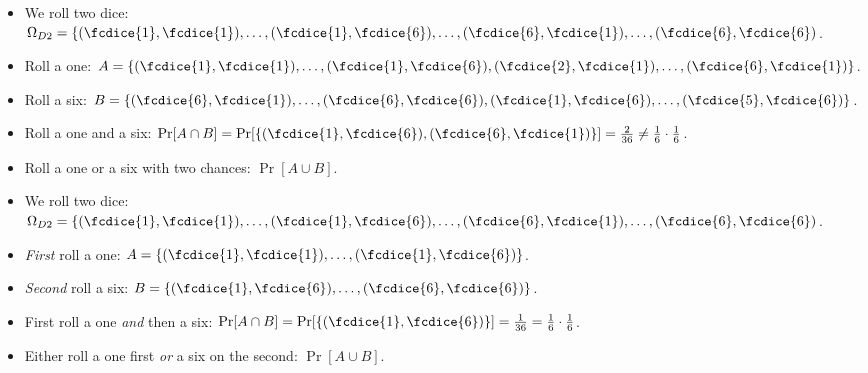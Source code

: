 \begin{frame}
  \begin{example}
    \begin{itemize}
      \item We roll two dice: \(\Omega_{D2} = \{(\fcdice{1},\fcdice{1}), 
          \ldots, (\fcdice{1}, \fcdice{6}), \ldots, (\fcdice{6}, \fcdice{1}), 
          \ldots, (\fcdice{6}, \fcdice{6})\).

        \pause{}

      \item Roll a one: \(A = \{(\fcdice{1}, \fcdice{1}), \ldots, (\fcdice{1}, 
          \fcdice{6}), (\fcdice{2}, \fcdice{1}), \ldots, (\fcdice{6}, 
          \fcdice{1})\}\).

      \item Roll a six: \(B = \{(\fcdice{6}, \fcdice{1}), \ldots, (\fcdice{6}, 
          \fcdice{6}), (\fcdice{1}, \fcdice{6}), \ldots, (\fcdice{5}, 
          \fcdice{6})\}\).

        \pause{}

      \item Roll a one and a six: \(\Pr[A\cap B] = \Pr[\{(\fcdice{1}, 
          \fcdice{6}), (\fcdice{6}, \fcdice{1})\}] = \frac{2}{36} \neq 
          \frac{1}{6}\cdot \frac{1}{6}\).

      \item Roll a one or a six with two chances: \(\Pr[A\cup B]\).

    \end{itemize}
  \end{example}
\end{frame}

\begin{frame}
  \begin{example}
    \begin{itemize}
      \item We roll two dice: \(\Omega_{D2} = \{(\fcdice{1},\fcdice{1}), 
          \ldots, (\fcdice{1}, \fcdice{6}), \ldots, (\fcdice{6}, \fcdice{1}), 
          \ldots, (\fcdice{6}, \fcdice{6})\).

        \pause{}

      \item \emph{First} roll a one: \(A = \{(\fcdice{1}, \fcdice{1}), \ldots, 
          (\fcdice{1}, \fcdice{6})\}\).

      \item \emph{Second} roll a six: \(B = \{(\fcdice{1}, \fcdice{6}), \ldots, 
          (\fcdice{6}, \fcdice{6})\}\).

        \pause{}

      \item First roll a one \emph{and} then a six: \(\Pr[A\cap B] 
          = \Pr[\{(\fcdice{1}, \fcdice{6})\}] = \frac{1}{36} = \frac{1}{6}\cdot 
          \frac{1}{6}\).

      \item Either roll a one first \emph{or} a six on the second: \(\Pr[A\cup 
          B]\).

    \end{itemize}
  \end{example}
\end{frame}

